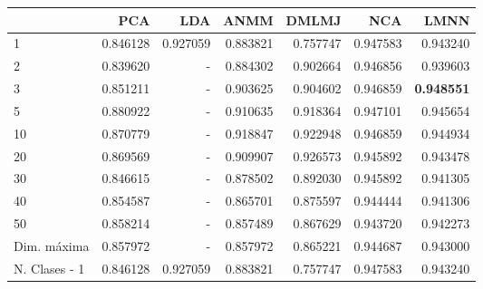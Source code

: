 \begin{tabular}{lrrrrrr}
\toprule
{} &       PCA &       LDA &      ANMM &     DMLMJ &       NCA &      LMNN \\
\midrule
1             &  0.846128 &  0.927059 &  0.883821 &  0.757747 &  0.947583 &  0.943240 \\
2             &  0.839620 &  -        &  0.884302 &  0.902664 &  0.946856 &  0.939603 \\
3             &  0.851211 &  -        &  0.903625 &  0.904602 &  0.946859 &  \textbf{0.948551} \\
5             &  0.880922 &  -        &  0.910635 &  0.918364 &  0.947101 &  0.945654 \\
10            &  0.870779 &  -        &  0.918847 &  0.922948 &  0.946859 &  0.944934 \\
20            &  0.869569 &  -        &  0.909907 &  0.926573 &  0.945892 &  0.943478 \\
30            &  0.846615 &  -        &  0.878502 &  0.892030 &  0.945892 &  0.941305 \\
40            &  0.854587 &  -        &  0.865701 &  0.875597 &  0.944444 &  0.941306 \\
50            &  0.858214 &  -        &  0.857489 &  0.867629 &  0.943720 &  0.942273 \\
Dim. máxima   &  0.857972 &  -        &  0.857972 &  0.865221 &  0.944687 &  0.943000 \\
N. Clases - 1 &  0.846128 &  0.927059 &  0.883821 &  0.757747 &  0.947583 &  0.943240 \\
\bottomrule
\end{tabular}
